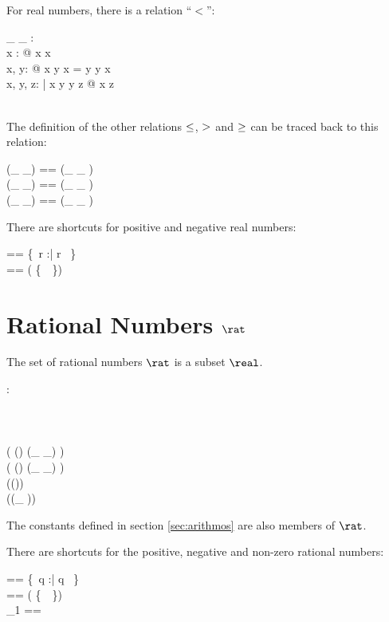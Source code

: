 \documentclass[12pt]{article}
\begin{document}
For real numbers, there is a relation ``$<$'':
%
\begin{axdef}
  \_ \alt \_ : \real \rel \real\\
  \where
  \forall x : \real @ \lnot x \alt x\\
  \forall x, y: \real @ x \alt y \lor x = y \lor y \alt x\\
  \forall x, y, z: \real | x \alt y \land y \alt z @ x \alt z \\
  \azero \alt \aone\\
\end{axdef}
%
The definition of the other relations $\leq$, $>$ and $\geq$ can
be traced back to this relation:
%
\begin{zed}
  (\_ \aleq \_) == (\_ \alt \_ ) \cup \id \real \\
  (\_ \agt \_) == (\_ \alt \_ ) \inv \\
  (\_ \ageq \_) == (\_ \agt \_ ) \cup \id \real \\
\end{zed}
%
There are shortcuts for positive and negative real numbers:
%
\begin{zed}
  \realplus == \{~r :\real | r \agt \azero~\}\\
  \realminus == \real \setminus ( \realplus \cup \{~\azero~\})
\end{zed}
%
\section{Rational Numbers $\rat$}
\label{sec:rational-numbers}
The set of rational numbers $\rat$ is a subset $\real$.
%
\begin{axdef}
  \rat : \power \real
  \where
  \azero \in \rat\\
  \aone \in \rat\\
  \atwo \in \rat\\
  \aten \in \rat\\
  \ran ( (\rat \cross \rat) \dres (\_ \aplus \_) ) \subset \rat\\
  \ran ( (\rat \cross \rat) \dres (\_ \amult \_) ) \subset \rat\\
  \ran (\rat \dres (\aneg ))  \subset \rat\\
  \ran (\rat \dres (\_ \ainv ))  \subset \rat\\
\end{axdef}
The constants defined in section \ref{sec:arithmos} are also members
of $\rat$.

There are shortcuts for the positive, negative and non-zero rational numbers:
\begin{zed}
  \ratplus == \{~q :\rat | q \agt \azero~\}\\
  \ratminus == \rat \setminus ( \ratplus \cup \{~\azero~\}) \\
  \rat_1 == \ratplus \cup \ratminus \\
\end{zed}
%
\end{document}
